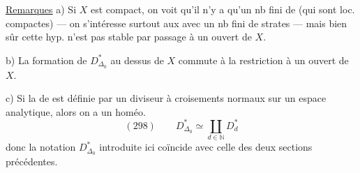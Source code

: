 
\uline{Remarques} a) Si $X$ est compact, on voit qu'il n'y a qu'un nb fini de   (qui sont loc. compactes) --- on s'intéresse surtout aux   avec un nb fini de strates --- mais bien sûr cette hyp. n'est pas stable par passage à un ouvert de $X$.

b) La formation de $D_{\Delta_0}^{*}$ au dessus de $X$ commute à la restriction à un ouvert de $X$.

c) Si la   de  est définie par un diviseur à croisements normaux sur un espace analytique, alors on a un homéo.
\[
(298)\qquad D_{\Delta_0}^{*}\simeq\coprod_{d\in\mathbb N}D_d^{*}
\]
donc la notation $D_{\Delta_0}^{*}$ introduite ici coïncide avec celle des  deux sections précédentes.

